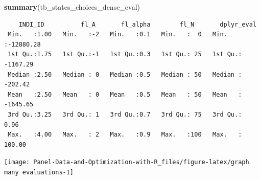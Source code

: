 \documentclass[
]{book}
\newenvironment{Shaded}{\begin{snugshade}}{\end{snugshade}}
\newcommand{\DataTypeTok}[1]{\textcolor[rgb]{0.13,0.29,0.53}{#1}}
\newcommand{\DecValTok}[1]{\textcolor[rgb]{0.00,0.00,0.81}{#1}}
\newcommand{\KeywordTok}[1]{\textcolor[rgb]{0.13,0.29,0.53}{\textbf{#1}}}
\newcommand{\NormalTok}[1]{#1}
\newcommand{\OperatorTok}[1]{\textcolor[rgb]{0.81,0.36,0.00}{\textbf{#1}}}
\newcommand{\StringTok}[1]{\textcolor[rgb]{0.31,0.60,0.02}{#1}}
\begin{document}
\begin{Shaded}
\begin{Highlighting}[]
\KeywordTok{summary}\NormalTok{(tb_states_choices_dense_eval)}
\end{Highlighting}
\end{Shaded}

\begin{verbatim}
    INDI_ID          fl_A       fl_alpha        fl_N       dplyr_eval       
 Min.   :1.00   Min.   :-2   Min.   :0.1   Min.   :  0   Min.   :-12880.28  
 1st Qu.:1.75   1st Qu.:-1   1st Qu.:0.3   1st Qu.: 25   1st Qu.: -1167.29  
 Median :2.50   Median : 0   Median :0.5   Median : 50   Median :  -202.42  
 Mean   :2.50   Mean   : 0   Mean   :0.5   Mean   : 50   Mean   : -1645.65  
 3rd Qu.:3.25   3rd Qu.: 1   3rd Qu.:0.7   3rd Qu.: 75   3rd Qu.:     0.96  
 Max.   :4.00   Max.   : 2   Max.   :0.9   Max.   :100   Max.   :   100.00  
\end{verbatim}

\begin{Shaded}
\end{Shaded}

\begin{center}\texttt{[image: Panel-Data-and-Optimization-with-R\_files/figure-latex/graph many evaluations-1]} \end{center}
\end{document}
